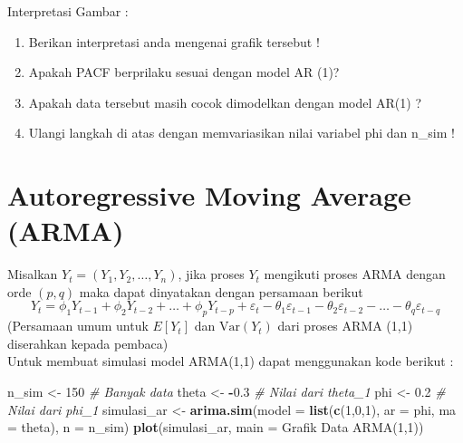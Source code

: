 \documentclass[
]{book}
\newenvironment{Shaded}{\begin{snugshade}}{\end{snugshade}}
\newcommand{\AttributeTok}[1]{\textcolor[rgb]{0.13,0.29,0.53}{#1}}
\newcommand{\CommentTok}[1]{\textcolor[rgb]{0.56,0.35,0.01}{\textit{#1}}}
\newcommand{\DecValTok}[1]{\textcolor[rgb]{0.00,0.00,0.81}{#1}}
\newcommand{\FloatTok}[1]{\textcolor[rgb]{0.00,0.00,0.81}{#1}}
\newcommand{\FunctionTok}[1]{\textcolor[rgb]{0.13,0.29,0.53}{\textbf{#1}}}
\newcommand{\NormalTok}[1]{#1}
\newcommand{\OtherTok}[1]{\textcolor[rgb]{0.56,0.35,0.01}{#1}}
\newcommand{\SpecialCharTok}[1]{\textcolor[rgb]{0.81,0.36,0.00}{\textbf{#1}}}
\newcommand{\StringTok}[1]{\textcolor[rgb]{0.31,0.60,0.02}{#1}}
\begin{document}
Interpretasi Gambar :

\begin{jp}{}{}
\begin{enumerate}
\item Berikan interpretasi anda mengenai grafik tersebut !  
\item Apakah PACF berprilaku sesuai dengan model AR (1)?
\item Apakah data tersebut masih cocok dimodelkan dengan model AR(1) ?
\item Ulangi langkah di atas dengan memvariasikan nilai variabel phi dan n\_sim !
\end{enumerate}
\end{jp}

\hypertarget{autoregressive-moving-average-arma}{%
\section{Autoregressive Moving Average (ARMA)}\label{autoregressive-moving-average-arma}}

Misalkan \(Y_t=(Y_1,Y_2,…,Y_n )\), jika proses \(Y_t\) mengikuti proses ARMA dengan orde \((p,q)\) maka dapat dinyatakan dengan persamaan berikut
\begin{equation}
Y_t=\phi_1 Y_{t-1}+\phi_2 Y_{t-2}+\dots+\phi_p Y_{t-p}+\varepsilon_{t}-\theta_1 \varepsilon_{t-1}-\theta_2 \varepsilon_{t-2}-\dots -\theta_q \varepsilon_{t-q}
\end{equation}
(Persamaan umum untuk \(E[Y_t]\) dan \(\text{Var}(Y_t)\) dari proses ARMA (1,1) diserahkan kepada pembaca)\\
Untuk membuat simulasi model ARMA(1,1) dapat menggunakan kode berikut :

\begin{Shaded}
\begin{Highlighting}[]
\NormalTok{n\_sim }\OtherTok{\textless{}{-}} \DecValTok{150} \CommentTok{\# Banyak data    }
\NormalTok{theta }\OtherTok{\textless{}{-}} \SpecialCharTok{{-}}\FloatTok{0.3} \CommentTok{\# Nilai dari theta\_1}
\NormalTok{phi }\OtherTok{\textless{}{-}} \FloatTok{0.2} \CommentTok{\# Nilai dari phi\_1 }
\NormalTok{simulasi\_ar }\OtherTok{\textless{}{-}} \FunctionTok{arima.sim}\NormalTok{(}\AttributeTok{model =} \FunctionTok{list}\NormalTok{(}\FunctionTok{c}\NormalTok{(}\DecValTok{1}\NormalTok{,}\DecValTok{0}\NormalTok{,}\DecValTok{1}\NormalTok{), }\AttributeTok{ar =}\NormalTok{ phi, }\AttributeTok{ma =}\NormalTok{ theta), }
                       \AttributeTok{n =}\NormalTok{ n\_sim)}
\FunctionTok{plot}\NormalTok{(simulasi\_ar, }\AttributeTok{main =} \StringTok{\textquotesingle{}Grafik Data ARMA(1,1)\textquotesingle{}}\NormalTok{)}
\end{Highlighting}
\end{Shaded}
\end{document}
